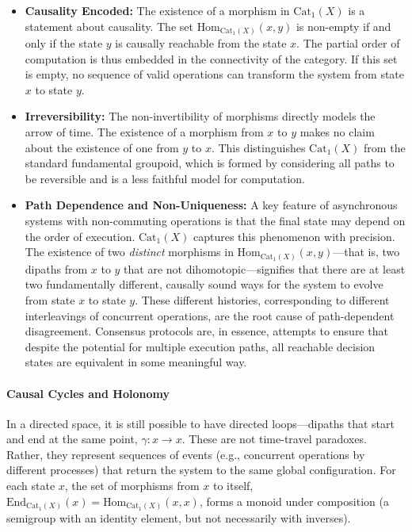 \documentclass[
]{article}
\begin{document}
\begin{itemize}
\item
  \textbf{Causality Encoded:} The existence of a morphism in
  \(\text{Cat}_1(X)\) is a statement about causality. The set
  \(\text{Hom}_{\text{Cat}_1(X)}(x, y)\) is non-empty if and only if the
  state \(y\) is causally reachable from the state \(x\). The partial
  order of computation is thus embedded in the connectivity of the
  category. If this set is empty, no sequence of valid operations can
  transform the system from state \(x\) to state \(y\).
\item
  \textbf{Irreversibility:} The non-invertibility of morphisms directly
  models the arrow of time. The existence of a morphism from \(x\) to
  \(y\) makes no claim about the existence of one from \(y\) to \(x\).
  This distinguishes \(\text{Cat}_1(X)\) from the standard fundamental
  groupoid, which is formed by considering all paths to be reversible
  and is a less faithful model for computation.
\item
  \textbf{Path Dependence and Non-Uniqueness:} A key feature of
  asynchronous systems with non-commuting operations is that the final
  state may depend on the order of execution. \(\text{Cat}_1(X)\)
  captures this phenomenon with precision. The existence of two
  \emph{distinct} morphisms in
  \(\text{Hom}_{\text{Cat}_1(X)}(x, y)\)---that is, two dipaths from
  \(x\) to \(y\) that are not dihomotopic---signifies that there are at
  least two fundamentally different, causally sound ways for the system
  to evolve from state \(x\) to state \(y\). These different histories,
  corresponding to different interleavings of concurrent operations, are
  the root cause of path-dependent disagreement. Consensus protocols
  are, in essence, attempts to ensure that despite the potential for
  multiple execution paths, all reachable decision states are equivalent
  in some meaningful way.
\end{itemize}

\paragraph{Causal Cycles and Holonomy}\label{causal-cycles-and-holonomy}

In a directed space, it is still possible to have directed
loops---dipaths that start and end at the same point,
\(\gamma: x \to x\). These are not time-travel paradoxes. Rather, they
represent sequences of events (e.g., concurrent operations by different
processes) that return the system to the same global configuration. For
each state \(x\), the set of morphisms from \(x\) to itself,
\(\text{End}_{\text{Cat}_1(X)}(x) = \text{Hom}_{\text{Cat}_1(X)}(x, x)\),
forms a monoid under composition (a semigroup with an identity element,
but not necessarily with inverses).
\end{document}
